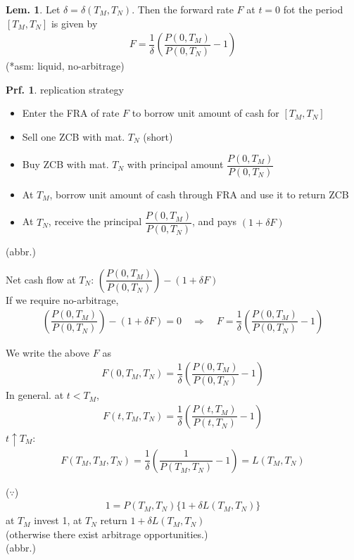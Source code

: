 \documentclass[a4paper,11pt]{jsarticle}
\theoremstyle{definition}
\newtheorem{lem}{Lem.}[subsection]
\newtheorem{prf}{Prf.}[subsection]
\newcommand{\df}[2]{\dfrac{#1}{#2}}
\begin{document}
\begin{lem}
  Let $\delta=\delta (T_M,T_N)$. Then the forward rate $F$
  at $t=0$ fot the period $[T_M,T_N]$ is given by
  \begin{align}
    F=\df{1}{\delta}\left(\df{P(0,T_M)}{P(0,T_N)}-1\right)
  \end{align}
  (*asm: liquid, no-arbitrage)

  \begin{prf}{replication strategy}
    \begin{itemize}
      \item Enter the FRA of rate $F$ to borrow
      unit amount of cash for $[T_M,T_N]$
      \item Sell one ZCB with mat. $T_N$ (short)
      \item Buy ZCB with mat. $T_N$ with principal amount
      $\df{P(0,T_M)}{P(0,T_N)}$
      \item At $T_M$, borrow unit amount of cash through FRA
      and use it to return ZCB
      \item At $T_N$, receive the principal $\df{P(0,T_M)}{P(0,T_N)}$,
      and pays $(1+\delta F)$
    \end{itemize}
    (abbr.)

    Net cash flow at $T_N$:
    $\left(\df{P(0,T_M)}{P(0,T_N)}\right)-(1+\delta F)$ \\
    If we require no-arbitrage, 
    \begin{align}
      \left(\df{P(0,T_M)}{P(0,T_N)}\right)-(1+\delta F)=0
      \quad \Rightarrow \quad
      F=\df{1}{\delta}\left(\df{P(0,T_M)}{P(0,T_N)}-1\right)
    \end{align}
  \end{prf}
\end{lem}

We write the above $F$ as
\begin{align}
  F(0,T_M,T_N)=\df{1}{\delta}\left(\df{P(0,T_M)}{P(0,T_N)}-1\right)
\end{align}
In general. at $t<T_M$,
\begin{align}
  F(t,T_M,T_N)=\df{1}{\delta}\left(\df{P(t,T_M)}{P(t,T_N)}-1\right)
\end{align}
$t\uparrow T_M$:
\begin{align}
  F(T_M,T_M,T_N)=\df{1}{\delta}\left(\df{1}{P(T_M,T_N)}-1\right)
  =L(T_M,T_N)
\end{align}

($\because$)
\begin{align}
  1=P(T_M,T_N)\{1+\delta L(T_M,T_N)\}
\end{align}
at $T_M$ invest 1, at $T_N$ return $1+\delta L(T_M,T_N)$ \\
(otherwise there exist arbitrage opportunities.) \\
(abbr.)
\end{document}
